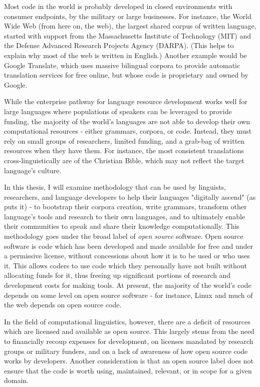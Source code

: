 Most code in the world is probably developed in closed environments with consumer endpoints, by the military or large businesses. For instance, the World Wide Web (from here on, the web), the largest shared corpus of written language, started with support from  the Massachusetts Institute of Technology (MIT) and the Defense Advanced Research Projects Agency (DARPA). (This helps to explain why most of the web is written in English.) Another example would be Google Translate, which uses massive bilingual corpora to provide automatic translation services for free online, but whose code is proprietary and owned by Google.

While the enterprise pathway for language resource development works well for large languages where populations of speakers can be leveraged to provide funding, the majority of the world's languages are not able to develop their own computational resources - either grammars, corpora, or code. Instead, they must rely on small groups of researchers, limited funding, and a grab-bag of written resources when they have them. For instance, the most consistent translations cross-linguistically are of the Christian Bible, which may not reflect the target language's culture.

In this thesis, I will examine methodology that can be used by linguists, researchers, and language developers to help their languages "digitally ascend" (as \citet{kornai2013digital} puts it) - to bootstrap their corpora creation, write grammars, transform other language's tools and research to their own languages, and to ultimately enable their communities to speak and share their knowledge computationally. This methodology goes under the broad label of \textit{open source} software. Open source software is code which has been developed and made available for free and under a permissive license, without concessions about how it is to be used or who uses it. This allows coders to use code which they personally have not built without allocating funds for it, thus freeing up significant portions of research and development costs for making tools. At present, the majority of the world's code depends on some level on open source software - for instance, Linux and much of the web depends on open source code.

In the field of computational linguistics, however, there are a deficit of resources which are licensed and available as open source. This largely stems from the need to financially recoup expenses for development, on licenses mandated by research groups or military funders, and on a lack of awareness of how open source code works by developers. Another consideration is that an open source label does not ensure that the code is worth using, maintained, relevant, or in scope for a given domain.


